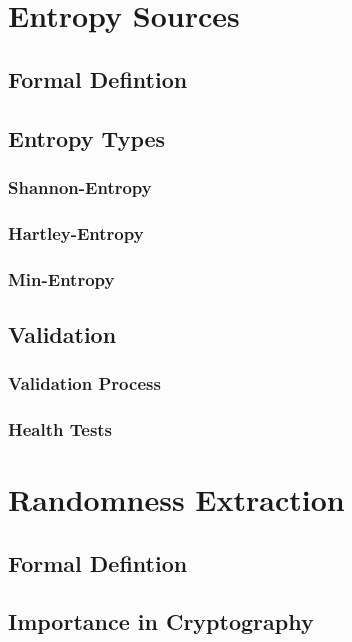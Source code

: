 \section{Entropy Sources}

\subsection{Formal Defintion}

\subsection{Entropy Types}

\subsubsection{Shannon-Entropy}

\subsubsection{Hartley-Entropy}

\subsubsection{Min-Entropy}

\subsection{Validation}

\subsubsection{Validation Process}

\subsubsection{Health Tests}

\section{Randomness Extraction}

\subsection{Formal Defintion}

\subsection{Importance in Cryptography}

